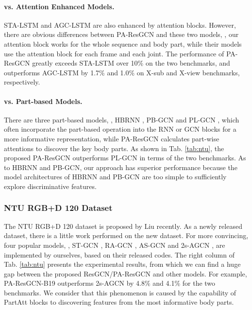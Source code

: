 \documentclass[sigconf]{acmart}
\begin{document}
\paragraph{vs. Attention Enhanced Models.} STA-LSTM \cite{song2017end} and AGC-LSTM \cite{si2019attention} are also enhanced by attention blocks. However, there are obvious differences between PA-ResGCN and these two models, \eg, our attention block works for the whole sequence and body part, while their models use the attention block for each frame and each joint. The performance of PA-ResGCN greatly exceeds STA-LSTM over 10\% on the two benchmarks, and outperforms AGC-LSTM by 1.7\% and 1.0\% on X-sub and X-view benchmarks, respectively.

\paragraph{vs. Part-based Models.} There are three part-based models, \ie, HBRNN \cite{du2015hierarchical}, PB-GCN \cite{thakkar2018part} and PL-GCN \cite{huang2020part}, which often incorporate the part-based operation into the RNN or GCN blocks for a more informative representation, while PA-ResGCN calculates part-wise attentions to discover the key body parts. As shown in Tab. \ref{tab:ntu}, the proposed PA-ResGCN outperforms PL-GCN in terms of the two benchmarks. As to HBRNN and PB-GCN, our approach has superior performance because the model architectures of HBRNN and PB-GCN are too simple to sufficiently explore discriminative features.

\subsubsection{NTU RGB+D 120 Dataset}
\label{sssec:ntu120}

The NTU RGB+D 120 dataset is proposed by Liu \etal \cite{liu2019ntu} recently. As a newly released dataset, there is a little work performed on the new dataset. For more convincing, four popular models, \ie, ST-GCN \cite{yan2018spatial}, RA-GCN \cite{song2019richly}, AS-GCN \cite{li2019actional} and 2s-AGCN \cite{shi2019two}, are implemented by ourselves, based on their released codes. The right column of Tab. \ref{tab:ntu} presents the experimental results, from which we can find a huge gap between the proposed ResGCN/PA-ResGCN and other models. For example, PA-ResGCN-B19 outperforms 2s-AGCN by 4.8\% and 4.1\% for the two benchmarks. We consider that this phenomenon is caused by the capability of PartAtt blocks to discovering features from the most informative body parts.
\end{document}
